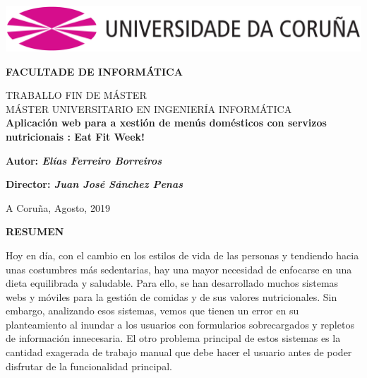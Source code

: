 \documentclass[12pt, a4paper, twoside]{book}
\begin{document}
	
	
	\thispagestyle{empty} 	
	
	\begin{center}		
		\includegraphics[width=15cm]{Imagenes/Simbolo_logo_UDC.png}
	\end{center}
	
	\vspace{2cm}
	
	\begin{center}		
		{\textbf{ FACULTADE DE INFORMÁTICA}}
		
		\vspace{1cm}
		\LARGE{ TRABALLO FIN DE MÁSTER }	\\
		\LARGE{ MÁSTER UNIVERSITARIO EN INGENIERÍA INFORMÁTICA } \\
		\vspace{1cm}	
		\LARGE{\textbf{ Aplicación web para a xestión de menús domésticos con servizos nutricionais : Eat Fit Week! }}
	\end{center}
	
	\vspace{2cm}
	\hfill \textbf{Autor: \textit{Elías Ferreiro Borreiros}}
	
	
	\hfill \textbf{Director: \textit{Juan José Sánchez Penas}} 
	
	
	\hfill A Coruña, Agosto, 2019					
	
	\clearpage
	
	\begin{center}
		\LARGE{\textbf{ RESUMEN }}	
	\end{center}
	Hoy en día, con el cambio en los estilos de vida de las personas y tendiendo hacia unas costumbres más sedentarias, hay una mayor necesidad de enfocarse en una dieta equilibrada y saludable.
	Para ello, se han desarrollado muchos sistemas webs y móviles para la gestión de comidas y de sus valores nutricionales.	Sin embargo, analizando esos sistemas, vemos que tienen un error en su planteamiento al inundar a los usuarios con formularios sobrecargados y repletos de información innecesaria. 
	El otro problema principal de estos sistemas es la cantidad exagerada de trabajo manual que debe hacer el usuario antes de poder disfrutar de la funcionalidad principal. 
	
\end{document}
